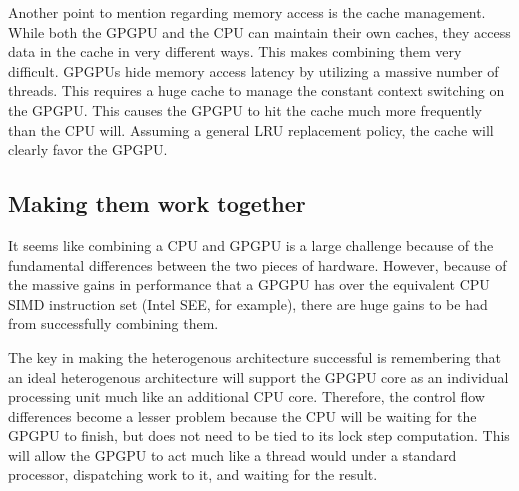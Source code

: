 Another point to mention regarding memory access is the cache management. While both the GPGPU and the CPU can maintain their own caches, they access data in the cache in very different ways. This makes combining them very difficult. GPGPUs hide memory access latency by utilizing a massive number of threads. This requires a huge cache to manage the constant context switching on the GPGPU. This causes the GPGPU to hit the cache much more frequently than the CPU will. Assuming a general LRU replacement policy, the cache will clearly favor the GPGPU. \cite{tlpcache}

\subsection*{Making them work together}

It seems like combining a CPU and GPGPU is a large challenge because of the fundamental differences between the two pieces of hardware. However, because of the massive gains in performance that a GPGPU has over the equivalent CPU SIMD instruction set (Intel SEE, for example), there are huge gains to be had from successfully combining them. 

The key in making the heterogenous architecture successful is remembering that an ideal heterogenous architecture will support the GPGPU core as an individual processing unit much like an additional CPU core. Therefore, the control flow differences become a lesser problem because the CPU will be waiting for the GPGPU to finish, but does not need to be tied to its lock step computation. This will allow the GPGPU to act much like a thread would under a standard processor, dispatching work to it, and waiting for the result. 












